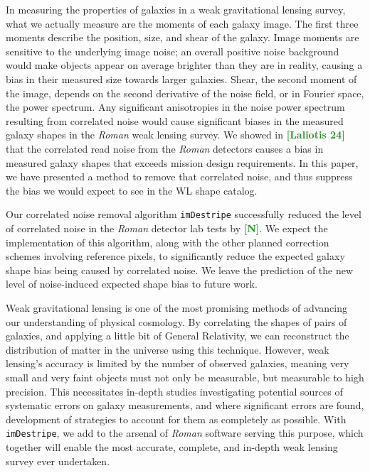 \documentclass[12pt]{pasj01}
\newcommand{\Katherine}[1]{{\textcolor{ForestGreen}{\bfseries{[#1]}}}}
\begin{document}
In measuring the properties of galaxies in a weak gravitational lensing survey, what we actually measure are the moments of each galaxy image. The first three moments describe the position, size, and shear of the galaxy. Image moments are sensitive to the  underlying image noise; an overall positive noise background would make objects appear on average brighter than they are in reality, causing a bias in their measured size towards larger galaxies. Shear, the second moment of the image, depends on the second derivative of the noise field, or in Fourier space, the power spectrum. Any significant anisotropies in the noise power spectrum resulting from correlated noise would cause significant biases in the measured galaxy shapes in the \textit{Roman} weak lensing survey. We showed in  \Katherine{Laliotis 24} that the correlated read noise from the \textit{Roman} detectors causes a bias in measured galaxy shapes that exceeds mission design requirements. In this paper, we have presented a method to remove that correlated noise, and thus suppress the bias we would expect to see in the WL shape catalog. 

Our correlated noise removal algorithm \texttt{imDestripe} successfully reduced the level of correlated noise in the \textit{Roman} detector lab tests by \Katherine{N}. We expect the implementation of this algorithm, along with the other planned correction schemes involving reference pixels, to significantly reduce the expected galaxy shape bias being caused by correlated noise. We leave the prediction of the new level of noise-induced expected shape bias to future work.

Weak gravitational lensing is one of the most promising methods of advancing our understanding of physical cosmology. By correlating the shapes of pairs of galaxies, and applying a little bit of General Relativity, we can reconstruct the distribution of matter in the universe using this technique. However, weak lensing's accuracy is limited by the number of observed galaxies, meaning very small and very faint objects must not only be measurable, but measurable to high precision. This necessitates in-depth studies investigating potential sources of systematic errors on galaxy measurements, and where significant errors are found, development of strategies to account for them as completely as possible. With \texttt{imDestripe}, we add to the arsenal of \textit{Roman} software serving this purpose, which together will enable the most accurate, complete, and in-depth weak lensing survey ever undertaken. 
\end{document}
